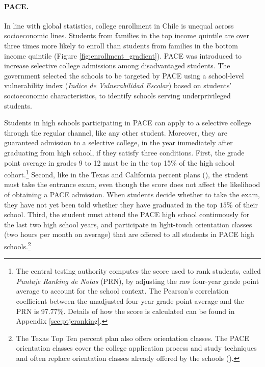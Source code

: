 \vspace{-10pt}
\paragraph{PACE.} In line with global statistics, college enrollment in Chile is unequal across socioeconomic lines. Students from families in the top income quintile are over three times more likely to enroll than students from families in the bottom income quintile (Figure \ref{fig:enrollment_gradient}). PACE was introduced to increase selective college admissions among disadvantaged students. The government selected the schools to be targeted by PACE using a school-level vulnerability index ({\itshape Indice de Vulnerabilidad Escolar}) based on students' socioeconomic characteristics, to identify schools serving underprivileged students.\par 
Students in high schools participating in PACE can apply to a selective college through the regular channel, like any other student. Moreover, they are guaranteed admission to a selective college, in the year immediately after graduating from high school, if they satisfy three conditions. First, the grade point average in grades 9 to 12 must be in the top 15$\%$ of the high school cohort.\footnote{\label{foot:corr_PNR_GPA}The central testing authority computes the score used to rank students, called {\itshape Puntaje Ranking de Notas} (PRN), by adjusting the raw four-year grade point average to account for the school context. The Pearson's correlation coefficient between the unadjusted four-year grade point average and the PRN is 97.77$\%$. Details of how the score is calculated can be found in Appendix \ref{sec:ptjeranking}.} Second, like in the Texas and California percent plans (\citealp{civil_rights_2003}), the student must take the entrance exam, even though the score does not affect the likelihood of obtaining a PACE admission. When students decide whether to take the exam, they have not yet been told whether they have graduated in the top $15\%$ of their school. Third, the student must attend the PACE high school continuously for the last two high school years, and participate in light-touch orientation classes (two hours per month on average) that are offered to all students in PACE high schools.\footnote{The Texas Top Ten percent plan also offers orientation classes. The PACE orientation classes cover the college application process and study techniques and often replace orientation classes already offered by the schools (\citealp{mineduc_2018}). }\par 



